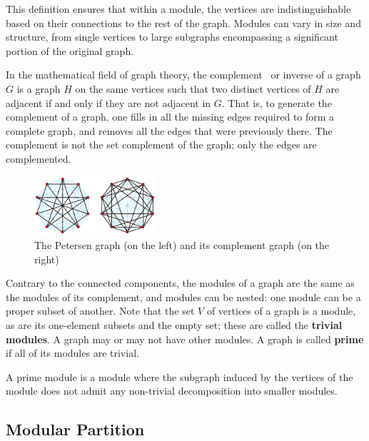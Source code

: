 This definition ensures that within a module, the vertices are indistinguishable based on their connections to the rest of the graph.
Modules can vary in size and structure, from single vertices to large subgraphs encompassing a significant portion of the original graph.

In the mathematical field of graph theory, the complement~\cite{complementgraphwikipedia} or inverse of a graph $G$ is a graph $H$ on the same vertices such that two distinct vertices of $H$ are adjacent if and only if they are not adjacent in $G$.
That is, to generate the complement of a graph, one fills in all the missing edges required to form a complete graph, and removes all the edges that were previously there.
The complement is not the set complement of the graph; only the edges are complemented.

\begin{figure}[!h]
    \centering
    \includegraphics[width=0.40\textwidth]{images/graphs/Petersen_graph_complement}
    \caption{The Petersen graph (on the left) and its complement graph (on the right) \cite{complementgraphwikipedia}}
    \label{fig:the}
\end{figure}

Contrary to the connected components, the modules of a graph are the same as the modules of its complement, and modules can be nested: one module can be a proper subset of another.
Note that the set $V$ of vertices of a graph is a module, as are its one-element subsets and the empty set; these are called the \textbf{trivial modules}.
A graph may or may not have other modules.
A graph is called \textbf{prime} if all of its modules are trivial.

\begin{mydef}
    A prime module is a module where the subgraph induced by the vertices of the module does not admit any non-trivial decomposition into smaller modules.
\end{mydef}


\subsection*{Modular Partition}\label{subsec:modular-partition}

